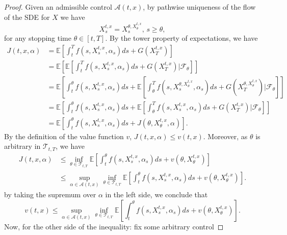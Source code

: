 \begin{proof}
    Given an admissible control $\mathcal{A}(t,x)$, by pathwise uniqueness of the flow of the SDE for $X$ we have
    \begin{equation}
        X_s^{t,x} =  X_s^{\theta, X_\theta^{t,x}}, \, s \geq \theta,
    \end{equation}
    for any stopping time $\theta \in [t,T]$. By the tower property of expectations, 
    we have
    \begin{align*}
        J(t,x,\alpha) &= \mathbb{E}\left[ \int_t^T f(s, X_s^{t,x}, \alpha_s) ds + G(X_T^{t,x})  \right] \\
        &= \mathbb{E}\left[ \mathbb{E} \left[ \int_t^T f(s, X_s^{t,x}, \alpha_s) ds + G(X_T^{t,x}) | \mathcal{F}_\theta \right] \right] \\
        &= \mathbb{E}\left[  \int_t^\theta f(s,X_s^{t,x}, \alpha_s) ds +  \mathbb{E} \left[ \int_\theta^T f(s, X_s^{\theta, X_\theta^{t,x}}, \alpha_s) ds + G(X_T^{\theta, X_\theta^{t,x}}) | \mathcal{F}_\theta \right] \right]\\ 
        &= \mathbb{E}\left[  \int_t^\theta f(s,X_s^{t,x}, \alpha_s) ds +  \mathbb{E} \left[ \int_\theta^T f(s, X_s^{t,x}, \alpha_s) ds + G(X_T^{t,x}) | \mathcal{F}_\theta \right] \right]\\ 
        &= \mathbb{E}\left[  \int_t^\theta f(s,X_s^{t,x}, \alpha_s) ds +  J(\theta, X_\theta^{t,x}, \alpha) \right].
    \end{align*}
    By the definition of the value function $v$, $J(t,x,\alpha) \leq v(t,x)$.
    Moreover, as $\theta$ is arbitrary in $\mathcal{T}_{t,T}$, we have
    \begin{align*}
        J(t,x,\alpha) &\leq \inf_{\theta \in \mathcal{T}_{t,T}} \mathbb{E}\left[ \int_t^\theta f(s, X_s^{t,x}, \alpha_s) ds  + v(\theta, X_\theta^{t,x})\right] \\
        & \leq \sup_{\alpha \in \mathcal{A}(t,x)} \inf_{\theta \in \mathcal{T}_{t,T}} \mathbb{E}\left[ \int_t^\theta f(s,X^{t,x}_s, \alpha_s) ds + v(\theta, X_\theta^{t,x}) \right]. 
    \end{align*}
    by taking the supremum over $\alpha$ in the left side, we conclude that
    \begin{equation}
        v(t,x)  \leq \sup_{\alpha \in \mathcal{A}(t,x)} \inf_{\theta \in \mathcal{T}_{t,T}} \mathbb{E}\left[ \int_t^\theta f(s,X^{t,x}_s, \alpha_s) ds + v(\theta, X_\theta^{t,x}) \right]. 
    \end{equation}
    Now, for the other side of the inequality: fix some arbitrary control

\end{proof}
